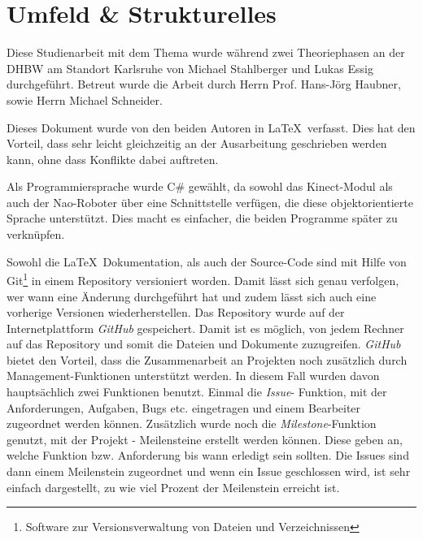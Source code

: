 

\section{Umfeld \& Strukturelles}
Diese Studienarbeit mit dem Thema \textit{\Titel} wurde während zwei Theoriephasen an der \ac{DHBW} am Standort Karlsruhe von Michael Stahlberger und Lukas Essig durchgeführt. Betreut wurde die Arbeit durch Herrn Prof. Hans-Jörg Haubner, sowie Herrn Michael Schneider. 

Dieses Dokument wurde von den beiden Autoren in \LaTeX\ verfasst. Dies hat den Vorteil, dass sehr leicht gleichzeitig an der Ausarbeitung geschrieben werden kann, ohne dass Konflikte dabei auftreten. 

Als Programmiersprache wurde C\# gewählt, da sowohl das Kinect-Modul als auch der Nao-Roboter über eine Schnittstelle verfügen, die diese objektorientierte Sprache unterstützt. Dies macht es einfacher, die beiden Programme später zu verknüpfen.

Sowohl die \LaTeX\ Dokumentation, als auch der Source-Code sind mit Hilfe von Git\footnote{Software zur Versionsverwaltung von Dateien und Verzeichnissen}  in einem Repository versioniert worden. Damit lässt sich genau verfolgen, wer wann eine Änderung durchgeführt hat und zudem lässt sich auch eine vorherige Versionen wiederherstellen.
Das Repository wurde auf der Internetplattform \textit{GitHub}  gespeichert. Damit ist es möglich, von jedem Rechner auf das Repository und somit die Dateien und Dokumente zuzugreifen. \textit{GitHub} bietet den Vorteil, dass die Zusammenarbeit an Projekten noch zusätzlich durch Management-Funktionen unterstützt werden. In diesem Fall wurden davon hauptsächlich zwei Funktionen benutzt. Einmal die \textit{Issue}- Funktion, mit der Anforderungen, Aufgaben, Bugs etc. eingetragen und einem Bearbeiter zugeordnet werden können. Zusätzlich wurde noch die \textit{Milestone}-Funktion genutzt, mit der Projekt - Meilensteine erstellt werden können. Diese geben an, welche Funktion bzw. Anforderung bis wann erledigt sein sollten. Die Issues sind dann einem Meilenstein zugeordnet und wenn ein Issue geschlossen wird, ist sehr einfach dargestellt, zu wie viel Prozent der Meilenstein erreicht ist.
